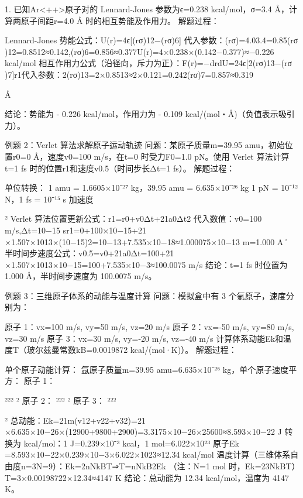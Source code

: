1. 已知\textrm{Ar}<++>原子对的 Lennard-Jones 参数为ϵ=0.238 kcal/mol，σ=3.4 Å，计算两原子间距r=4.0 Å 时的相互势能及作用力。
解题过程：

    Lennard-Jones 势能公式：U(r)=4ϵ[(rσ​)12−(rσ​)6]
    代入参数：(rσ​)=4.03.4​=0.85(rσ​)12=0.8512≈0.142,(rσ​)6=0.856≈0.377U(r)=4×0.238×(0.142−0.377)≈−0.226 kcal/mol
    相互作用力公式（沿径向，斥力为正）：F(r)=−drdU​=24ϵ[2(rσ​)13−(rσ​)7]r1​
    代入参数：2(rσ​)13=2×0.8513≈2×0.121=0.242(rσ​)7=0.857≈0.319

Å


    结论：势能为 - 0.226 kcal/mol，作用力为 - 0.109 kcal/(mol・Å)（负值表示吸引力）。

例题 2：Verlet 算法求解原子运动轨迹
问题：某原子质量m=39.95 amu，初始位置r0​=0 Å，速度v0​=100 m/s，在t=0 时受力F0​=1.0 pN。使用 Verlet 算法计算t=1 fs 时的位置r1​和速度v0.5​（时间步长Δt=1 fs）。
解题过程：

    单位转换：
        1 amu = 1.6605×10⁻²⁷ kg，39.95 amu = 6.635×10⁻²⁶ kg
        1 pN = 10⁻¹² N，1 fs = 10⁻¹⁵ s
        加速度

        ²
    Verlet 算法位置更新公式：r1​=r0​+v0​Δt+21​a0​Δt2
    代入数值：v0​=100 m/s,Δt=10−15 sr1​=0+100×10−15+21​×1.507×1013×(10−15)2=10−13+7.535×10−18≈1.000075×10−13 m=1.000 A˚
    半时间步速度公式：v0.5​=v0​+21​a0​Δt=100+21​×1.507×1013×10−15=100+7.535×10−3≈100.0075 m/s
    结论：t=1 fs 时位置为 1.000 Å，半时间步速度为 100.0075 m/s。

例题 3：三维原子体系的动能与温度计算
问题：模拟盒中有 3 个氩原子，速度分别为：

    原子 1：vx​=100 m/s, vy​=50 m/s, vz​=20 m/s
    原子 2：vx​=-50 m/s, vy​=80 m/s, vz​=30 m/s
    原子 3：vx​=30 m/s, vy​=-20 m/s, vz​=-40 m/s
    计算体系动能Ek​和温度T（玻尔兹曼常数kB​=0.0019872 kcal/(mol·K)）。
    解题过程：


    单个原子动能计算：
    氩原子质量m=39.95 amu=6.635×10⁻²⁶ kg，单个原子速度平方：
        原子 1：

²²²
²
原子 2：
²²²
²
原子 3：
²²²

        ²
    总动能：Ek​=21​m(v12​+v22​+v32​)=21​×6.635×10−26×(12900+9800+2900)=3.3175×10−26×25600≈8.593×10−22 J
    转换为 kcal/mol：1 J=0.239×10⁻³ kcal，1 mol=6.022×10²³ 原子Ek​=8.593×10−22×0.239×10−3×6.022×1023≈12.34 kcal/mol
    温度计算（三维体系自由度n=3N=9）：Ek​=2n​NkB​T⇒T=nNkB​2Ek​​
    （注：N=1 mol 时，Ek​=23​NkB​T）T=3×0.00198722×12.34​≈4147 K
    结论：总动能为 12.34 kcal/mol，温度为 4147 K。

